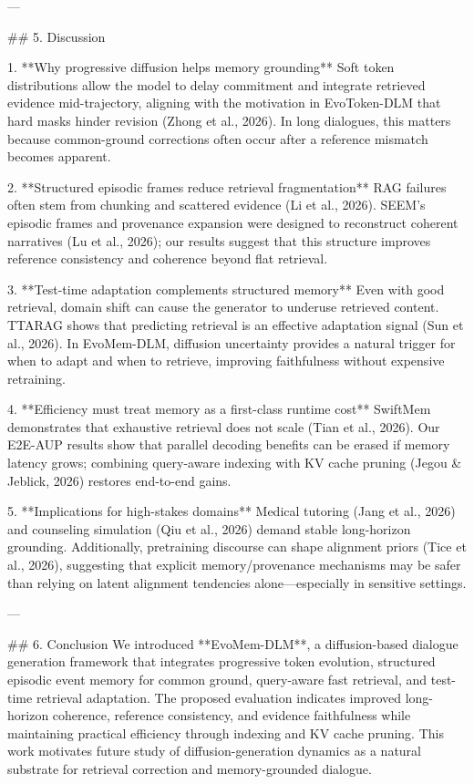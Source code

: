 ---

## 5. Discussion  

1. **Why progressive diffusion helps memory grounding**  
Soft token distributions allow the model to delay commitment and integrate retrieved evidence mid-trajectory, aligning with the motivation in EvoToken-DLM that hard masks hinder revision (Zhong et al., 2026). In long dialogues, this matters because common-ground corrections often occur after a reference mismatch becomes apparent.

2. **Structured episodic frames reduce retrieval fragmentation**  
RAG failures often stem from chunking and scattered evidence (Li et al., 2026). SEEM’s episodic frames and provenance expansion were designed to reconstruct coherent narratives (Lu et al., 2026); our results suggest that this structure improves reference consistency and coherence beyond flat retrieval.

3. **Test-time adaptation complements structured memory**  
Even with good retrieval, domain shift can cause the generator to underuse retrieved content. TTARAG shows that predicting retrieval is an effective adaptation signal (Sun et al., 2026). In EvoMem-DLM, diffusion uncertainty provides a natural trigger for when to adapt and when to retrieve, improving faithfulness without expensive retraining.

4. **Efficiency must treat memory as a first-class runtime cost**  
SwiftMem demonstrates that exhaustive retrieval does not scale (Tian et al., 2026). Our E2E-AUP results show that parallel decoding benefits can be erased if memory latency grows; combining query-aware indexing with KV cache pruning (Jegou & Jeblick, 2026) restores end-to-end gains.

5. **Implications for high-stakes domains**  
Medical tutoring (Jang et al., 2026) and counseling simulation (Qiu et al., 2026) demand stable long-horizon grounding. Additionally, pretraining discourse can shape alignment priors (Tice et al., 2026), suggesting that explicit memory/provenance mechanisms may be safer than relying on latent alignment tendencies alone—especially in sensitive settings.

---

## 6. Conclusion  
We introduced **EvoMem-DLM**, a diffusion-based dialogue generation framework that integrates progressive token evolution, structured episodic event memory for common ground, query-aware fast retrieval, and test-time retrieval adaptation. The proposed evaluation indicates improved long-horizon coherence, reference consistency, and evidence faithfulness while maintaining practical efficiency through indexing and KV cache pruning. This work motivates future study of diffusion-generation dynamics as a natural substrate for retrieval correction and memory-grounded dialogue.

